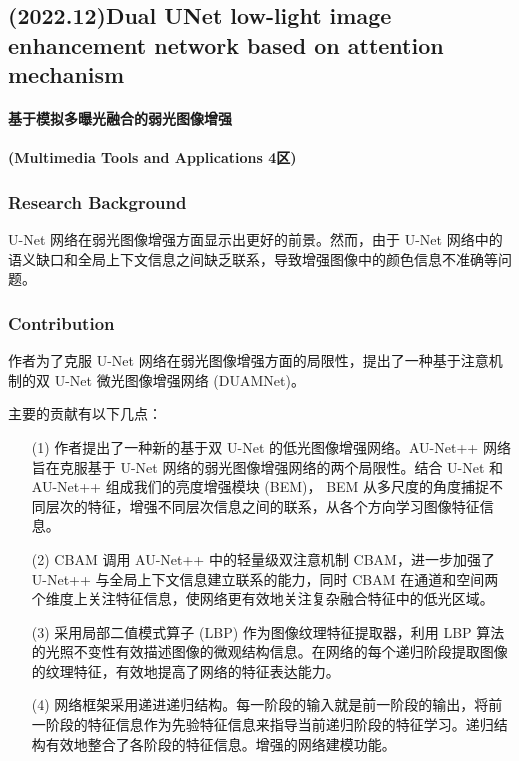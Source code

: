 \documentclass[a4paper, 10pt]{article}
\begin{document}
		\subsection{(2022.12)Dual UNet low-light image enhancement network based on attention mechanism}
		
		\paragraph{基于模拟多曝光融合的弱光图像增强}
		
		\paragraph{(Multimedia Tools and Applications 4区)}
		
			\subsubsection{Research Background}
			
			U-Net 网络在弱光图像增强方面显示出更好的前景。然而，由于 U-Net 网络中的语义缺口和全局上下文信息之间缺乏联系，导致增强图像中的颜色信息不准确等问题。
			
			\subsubsection{Contribution}
			
			作者为了克服 U-Net 网络在弱光图像增强方面的局限性，提出了一种基于注意机制的双 U-Net 微光图像增强网络 (DUAMNet)。
			
			主要的贡献有以下几点：
			
			\begin{itemize}
				\item[(1)] 
				作者提出了一种新的基于双 U-Net 的低光图像增强网络。AU-Net++ 网络旨在克服基于 U-Net 网络的弱光图像增强网络的两个局限性。结合 U-Net 和 AU-Net++ 组成我们的亮度增强模块 (BEM)， BEM 从多尺度的角度捕捉不同层次的特征，增强不同层次信息之间的联系，从各个方向学习图像特征信息。
				
				\item[(2)]
				CBAM 调用 AU-Net++ 中的轻量级双注意机制 CBAM，进一步加强了 U-Net++ 与全局上下文信息建立联系的能力，同时 CBAM 在通道和空间两个维度上关注特征信息，使网络更有效地关注复杂融合特征中的低光区域。
				
				\item[(3)]
				采用局部二值模式算子 (LBP) 作为图像纹理特征提取器，利用 LBP 算法的光照不变性有效描述图像的微观结构信息。在网络的每个递归阶段提取图像的纹理特征，有效地提高了网络的特征表达能力。
				
				\item[(4)]
				网络框架采用递进递归结构。每一阶段的输入就是前一阶段的输出，将前一阶段的特征信息作为先验特征信息来指导当前递归阶段的特征学习。递归结构有效地整合了各阶段的特征信息。增强的网络建模功能。
				
			\end{itemize}	
			
\end{document}
